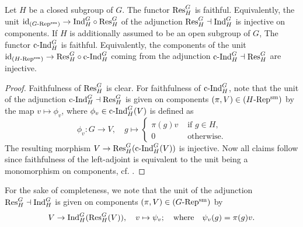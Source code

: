 \documentclass[../main.tex]{subfiles}
\begin{document}
\begin{lem}\label{lem:FrobRecUnitsAreInjective}
  Let $H$ be a closed subgroup of $G$. The functor $\mathrm{Res}_H^G$ is faithful.
  Equivalently, the unit $\operatorname{id}_{{({G}\text-\allowbreak\mathrm{Rep^{\mathrm{sm}}})}} \to \mathrm{Ind}_H^G \circ \mathrm{Res}_H^G$ of 
  the adjunction $\mathrm{Res}_H^G \dashv \mathrm{Ind}_H^G$ is injective on components.
  If $H$ is additionally assumed to be an open subgroup of $G$,
  The functor $\mathrm{c\text{-}Ind}_H^G$ is faithful. 
  Equivalently, the components of the unit
    $\operatorname{id}_{{({H}\text-\allowbreak\mathrm{Rep^{\mathrm{sm}}})}} \to \mathrm{Res}_H^G \circ \mathrm{c\text{-}Ind}_H^G$
  coming from the adjunction $\mathrm{c\text{-}Ind}_H^G \dashv \mathrm{Res}_H^G$ are injective. 
\begin{proof}
  Faithfulness of $\mathrm{Res}_H^G$ is clear. For faithfulness of $\mathrm{c\text{-}Ind}_H^G$, note that 
  the unit of the adjunction $\mathrm{c\text{-}Ind}_H^G \dashv \mathrm{Res}_H^G$ is given 
  on components $(\pi, V) \in {({H}\text-\allowbreak\mathrm{Rep^{\mathrm{sm}}})}$ by the map 
  $v \mapsto \phi_v$, where $\phi_v \in \mathrm{c\text{-}Ind}_H^G(V)$ is defined as
  \begin{equation*}
    \phi_v: G \to V, \quad g \mapsto \begin{cases}
      \pi(g)v &\text{ if } g \in H,\\
      0       &\text{ otherwise.}
    \end{cases}
  \end{equation*}
  The resulting morphism $V \to \mathrm{Res}_H^G ( \mathrm{c\text{-}Ind}_H^G(V))$ is injective. Now all
  claims follow since faithfulness of the left-adjoint is 
  equivalent to the unit being a monomorphism on components, cf. \cite[Lemma
  4.5.13]{riehl2017category}.
\end{proof}
\end{lem}

\begin{rmk} 
  For the sake of completeness, we note that the unit of the adjunction 
  $\mathrm{Res}_H^G \dashv \mathrm{Ind}_H^G$ is given on components $(\pi, V) \in {({G}\text-\allowbreak\mathrm{Rep^{\mathrm{sm}}})}$ by
  \begin{equation*}
    V \to \mathrm{Ind}_H^G( \mathrm{Res}_H^G(V)), \quad v \mapsto \psi_v; \quad
    \text{where}\quad \psi_v(g) = \pi(g) v.
  \end{equation*}
\end{rmk}
\end{document}
